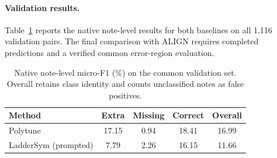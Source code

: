 \paragraph{Validation results.}
Table~\ref{tab:validation-native-baselines} reports the native note-level
results for both baselines on all 1,116 validation pairs. The final comparison with ALIGN requires
completed predictions and a verified common error-region evaluation.

\begin{table}[t]
\centering
\caption{Native note-level micro-F1 (\%) on the common validation set.
Overall retains class identity and counts unclassified notes as false positives.}
\label{tab:validation-native-baselines}
\begin{tabular}{lcccc}
\hline
Method & Extra & Missing & Correct & Overall \\
\hline
Polytune & 17.15 & 0.94 & 18.41 & 16.99 \\
LadderSym (prompted) & 7.79 & 2.26 & 16.15 & 11.66 \\
\hline
\end{tabular}
\end{table}
